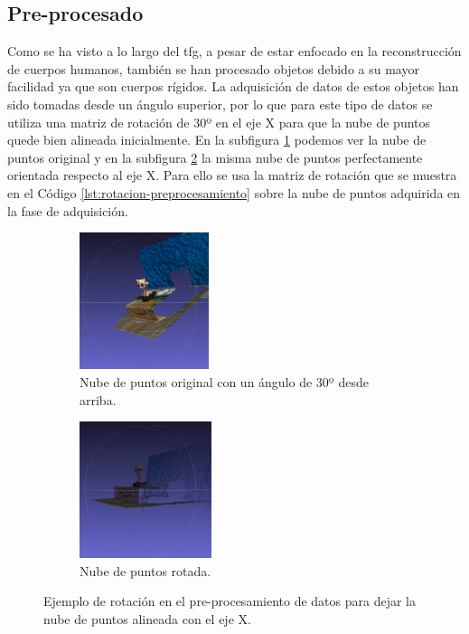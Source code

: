 \subsection{Pre-procesado}

Como se ha visto a lo largo del \gls{tfg}, a pesar de estar enfocado en la reconstrucción de cuerpos humanos, también se han procesado objetos debido a su mayor facilidad ya que son cuerpos rígidos.
La adquisición de datos de estos objetos han sido tomadas desde un ángulo superior, por lo que para este tipo de datos se utiliza una matriz de rotación de 30º en el eje X para que la nube de puntos quede bien alineada inicialmente. En la subfigura \ref{fig:preprocesamiento-sin-rotar} podemos ver la nube de puntos original y en la subfigura \ref{fig:preprocesamiento-rotado} la misma nube de puntos perfectamente orientada respecto al eje X.
Para ello se usa la matriz de rotación que se muestra en el Código \ref{lst:rotacion-preprocesamiento} sobre la nube de puntos adquirida en la fase de adquisición.

\begin{figure}[h]
    \centering
    \begin{subfigure}[t]{0.33\textheight}
    	\centering
        \includegraphics[height=4cm]{archivos/preprocesamiento-sin-rotar.png}
        \caption{Nube de puntos original con un ángulo de 30º desde arriba.}
        \label{fig:preprocesamiento-sin-rotar}
    \end{subfigure}
    \begin{subfigure}[t]{0.33\textheight}
    	\centering
        \includegraphics[height=4cm]{archivos/preprocesamiento-rotado.png}
        \caption{Nube de puntos rotada.}
        \label{fig:preprocesamiento-rotado}
\end{subfigure}
    \caption{Ejemplo de rotación en el pre-procesamiento de datos para dejar la nube de puntos alineada con el eje X.}
    \label{fig:preprocesamiento-rotar}
\end{figure}

